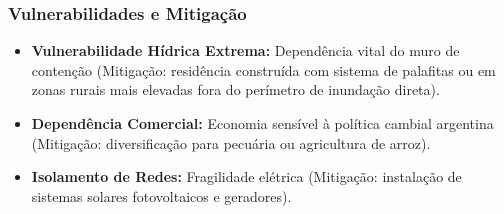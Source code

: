 \subsubsection{Vulnerabilidades e
Mitigação}

\begin{itemize}
\tightlist
\item
  \textbf{Vulnerabilidade Hídrica Extrema:} Dependência vital do muro de
  contenção (Mitigação: residência construída com sistema de palafitas
  ou em zonas rurais mais elevadas fora do perímetro de inundação
  direta).
\item
  \textbf{Dependência Comercial:} Economia sensível à política cambial
  argentina (Mitigação: diversificação para pecuária ou agricultura de
  arroz).
\item
  \textbf{Isolamento de Redes:} Fragilidade elétrica (Mitigação:
  instalação de sistemas solares fotovoltaicos e geradores).
\end{itemize}

